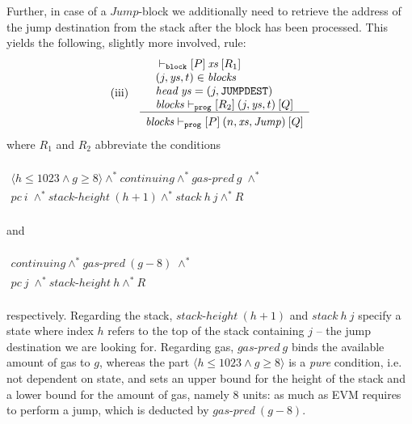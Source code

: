\documentclass[sigplan,10pt,review]{acmart}\settopmatter{printfolios=true,printccs=false,printacmref=false}
\newcommand{\sconj}{\wedge^*}
\newcommand{\ttrip}[5]{\mathit{#1} \vdash_{\mathrm{#2}}[#3]\:#4\:[#5]}
\newcommand{\cont}{\mathit{continuing}}
\newcommand{\pc}{\mathit{pc}}
\newcommand{\gaspred}{\mathit{gas\mbox{-}pred}}
\newcommand{\stackh}{\mathit{stack\mbox{-}height}}
\newcommand{\stack}{\mathit{stack}}
\newcommand{\instr}[1]{\mathtt{#1}}
\newcommand{\pure}[1]{\langle#1\rangle}
\newcommand{\hd}{\mathit{head}\:}
\newcommand{\RuleC}[2]{\begin{array}{c}#1\\\hline\noalign{\smallskip}#2\end{array}}
\begin{document}
Further, in case of a $\mathit{Jump}$-block we additionally need to retrieve the address of the jump 
destination from the stack 
after the block has been processed. This yields the following, slightly more involved, rule:
\[
\begin{array}{l l}
\mbox{(iii)} & \RuleC{\begin{array}{l}\ttrip{}{\mathtt{block}}{P}{\mathit{xs}}{R_1} \\
                                      (j, \mathit{ys},t) \in \mathit{blocks} \\
                                      \hd\mathit{ys} = (j, \instr{JUMPDEST}) \\
                                      \ttrip{\mathit{blocks}}{\mathtt{prog}}{R_2}{(j, \mathit{ys},t)}{Q}
                      \end{array}}
     {\ttrip{\mathit{blocks}}{\mathtt{prog}}{P}{(n, \mathit{xs}, \mathit{Jump})}{Q}}
\end{array}
\]
where $R_1$ and $R_2$ abbreviate the conditions \\
\\$
\begin{array}{l}
\pure{h \le 1023 \wedge g \geq 8} \sconj \cont \sconj \gaspred\:g \; \sconj \\
\pc\:i \; \sconj \stackh\:(h + 1) \sconj \stack\:h\:j \sconj R 
\end{array}
$\\ 
\\
and\\
\\$
\begin{array}{l}
\cont \sconj \gaspred\:(g - 8) \; \sconj \\
\pc\:j \; \sconj \stackh\:h \sconj R 
\end{array}
$\\
\\respectively. 
Regarding the stack, $\stackh\:(h + 1)$ and $\stack\:h\:j$ specify a state where
index $h$ refers to the top of the stack containing $j$ -- the jump destination we are looking for. 
Regarding gas, $\gaspred\:g$
binds the available amount of gas to $g$, whereas 
the part $\pure{h \le 1023 \wedge g \geq 8}$ is a \emph{pure} condition,
i.e. not dependent on state, and sets an upper bound for the height of
the stack and a lower bound for the amount of gas, namely $8$ units: 
as much as EVM requires to perform a jump, which is deducted by $\gaspred\:(g - 8)$.   
\end{document}
